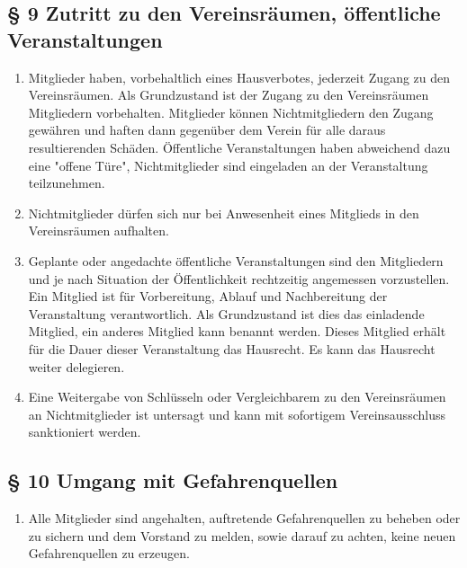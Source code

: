 \documentclass[10pt,a4paper]{article}
\begin{document}
\subsection*{§ 9 Zutritt zu den Vereinsräumen, öffentliche Veranstaltungen}
\begin{enumerate}
\item Mitglieder haben, vorbehaltlich eines Hausverbotes, jederzeit Zugang zu
den Vereinsräumen. Als Grundzustand ist der Zugang zu den Vereinsräumen
Mitgliedern vorbehalten. Mitglieder können Nichtmitgliedern den Zugang
gewähren und haften dann gegenüber dem Verein für alle daraus resultierenden Schäden.
Öffentliche Veranstaltungen haben abweichend dazu eine "offene Türe",
Nichtmitglieder sind eingeladen an der Veranstaltung teilzunehmen.
\item Nichtmitglieder dürfen sich nur bei Anwesenheit eines Mitglieds in den
Vereinsräumen aufhalten.
\item Geplante oder angedachte öffentliche Veranstaltungen sind den Mitgliedern und je nach Situation der Öffentlichkeit rechtzeitig angemessen vorzustellen. Ein Mitglied ist für Vorbereitung, Ablauf und Nachbereitung der Veranstaltung verantwortlich. Als Grundzustand ist dies das einladende Mitglied, ein anderes Mitglied kann benannt werden. Dieses Mitglied erhält für die Dauer dieser Veranstaltung das Hausrecht. Es kann das Hausrecht weiter delegieren.
\item Eine Weitergabe von Schlüsseln oder Vergleichbarem zu den Vereinsräumen an Nichtmitglieder ist untersagt und kann mit sofortigem Vereinsausschluss sanktioniert werden.
\end{enumerate}

%
%
\subsection*{§ 10 Umgang mit Gefahrenquellen}
\begin{enumerate}
\item Alle Mitglieder sind angehalten, auftretende Gefahrenquellen zu
    beheben oder zu sichern und dem Vorstand zu melden, sowie darauf zu achten, keine
    neuen Gefahrenquellen zu erzeugen.
\end{enumerate}
\end{document}
